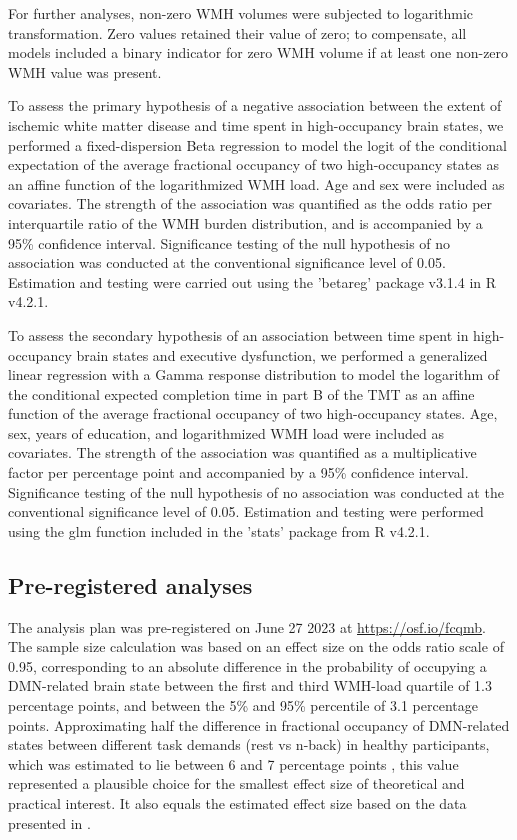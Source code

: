 For further analyses, non-zero WMH volumes were subjected to logarithmic transformation.
Zero values retained their value of zero; to compensate, all models included a binary indicator for zero WMH volume if at least one non-zero WMH value was present.

To assess the primary hypothesis of a negative association between the extent of ischemic white matter disease and time spent in high-occupancy brain states, we performed a fixed-dispersion Beta regression to model the logit of the conditional expectation of the average fractional occupancy of two high-occupancy states as an affine function of the logarithmized WMH load.
Age and sex were included as covariates.
The strength of the association was quantified as the odds ratio per interquartile ratio of the WMH burden distribution, and is accompanied by a 95\% confidence interval.
Significance testing of the null hypothesis of no association was conducted at the conventional significance level of 0.05.
Estimation and testing were carried out using the 'betareg' package v3.1.4 in R v4.2.1.

To  assess the secondary hypothesis of an association between time spent in high-occupancy brain states and executive dysfunction, we performed a generalized linear regression with a Gamma response distribution to model the logarithm of the conditional expected completion time in part B of the TMT as an affine function of the average fractional occupancy of two high-occupancy states.
Age, sex, years of education, and logarithmized WMH load were included as covariates.
The strength of the association was quantified as a multiplicative factor per percentage point and accompanied by a 95\% confidence interval.
Significance testing of the null hypothesis of no association was conducted at the conventional significance level of 0.05.
Estimation and testing were performed using the glm function included in the 'stats' package from R v4.2.1.

\subsection{Pre-registered analyses}
The analysis plan was pre-registered on June 27 2023 at \url{https://osf.io/fcqmb}. The sample size calculation was based on an effect size on the odds ratio scale of 0.95, corresponding to an absolute difference in the probability of occupying a DMN-related brain state between the first and third WMH-load quartile of 1.3 percentage points, and between the 5\% and 95\% percentile of 3.1 percentage points. Approximating half the difference in fractional occupancy of DMN-related states between different task demands (rest vs n-back) in healthy participants, which was estimated to lie between 6 and 7 percentage points \citep{Cornblath2020-fu}, this value represented a plausible choice for the smallest effect size of theoretical and practical interest. It also equals the estimated effect size based on the data presented in \citep{Schlemm2022-he}.


